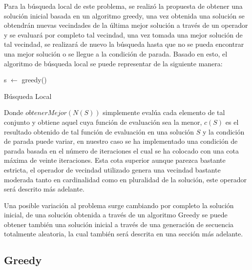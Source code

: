 \documentclass{ci5652}
\begin{document}
  Para la búsqueda local de este problema, se realizó la propuesta de obtener una solución inicial basada en un algoritmo greedy, una vez obtenida una solución se obtendrán nuevas vecindades de la última mejor solución a través de un operador y se evaluará por completo tal vecindad, una vez tomada una mejor solución de tal vecindad, se realizará de nuevo la búsqueda hasta que no se pueda encontrar una mejor solución o se llegue a la condición de parada. Basado en esto, el algoritmo de búsqueda local se puede representar de la siguiente manera:
    
\begin{algorithm}
 \DontPrintSemicolon
 \vspace*{0.1cm}
 s $\leftarrow$ greedy()\;
 
 \vspace*{0.1cm}
 \caption{Búsqueda Local}
\end{algorithm}
    
  Donde \(obtenerMejor(N(S))\) simplemente evalúa cada elemento de tal conjunto y obtiene aquel cuya función de evaluación sea la menor, \(c(S)\) es el resultado obtenido de tal función de evaluación en una solución \(S\) y la condición de parada puede variar, en nuestro caso se ha implementado una condición de parada basada en el número de iteraciones el cual se ha colocado con una cota máxima de veinte iteraciones. Esta cota superior aunque parezca bastante estricta, el operador de vecindad utilizado genera una vecindad bastante moderada tanto en cardinalidad como en pluralidad de la solución, este operador será descrito más adelante. 
  
  Una posible variación al problema surge cambiando por completo la solución inicial, de una solución obtenida a través de un algoritmo Greedy se puede obtener también una solución inicial a través de una generación de secuencia totalmente aleatoria, la cual también será descrita en una sección más adelante.

\subsection{Greedy}
\end{document}
